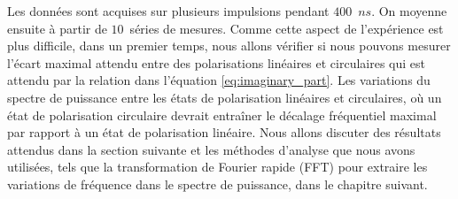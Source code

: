 \begin{onehalfspace}
    \noindent Les données sont acquises %
    sur plusieurs impulsions pendant 
    $400$ $ns$. On moyenne ensuite à partir de $10$ séries de mesures. 
    Comme cette aspect de l'expérience est plus difficile, dans un 
    premier temps,
    nous allons vérifier si nous pouvons mesurer l’écart maximal attendu 
    entre des polarisations linéaires et circulaires qui est attendu par 
    la relation dans l'équation \ref{eq:imaginary_part}. 
    Les variations du spectre de puissance entre les états de polarisation 
    linéaires et circulaires, où un état de polarisation circulaire 
    devrait entraîner le décalage fréquentiel maximal par rapport à un 
    état de polarisation linéaire. 
    Nous allons discuter des résultats attendus dans la section 
    suivante et les méthodes d'analyse que nous avons utilisées, tels 
    que la transformation de Fourier rapide (FFT) pour extraire les 
    variations de fréquence dans le spectre de puissance, dans le 
    chapitre suivant.

\end{onehalfspace}